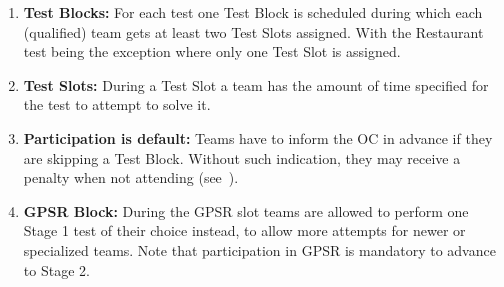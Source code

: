 \begin{enumerate}
	\item \textbf{Test Blocks:} For each test one Test Block is scheduled during which each (qualified) team gets at least two Test Slots assigned. With the Restaurant test being the exception where only one Test Slot is assigned.

	\item \textbf{Test Slots:} During a Test Slot a team has the amount of time specified for the test to attempt to solve it. 

	\item \textbf{Participation is default:} Teams have to inform the OC in advance if they are skipping a Test Block. Without such indication, they may receive a penalty when not attending (see~).
	
	\item \textbf{GPSR Block: } During the GPSR slot teams are allowed to perform one Stage 1 test of their choice instead, to allow more attempts for newer or specialized teams. Note that participation in GPSR is mandatory to advance to Stage 2. 
\end{enumerate}

